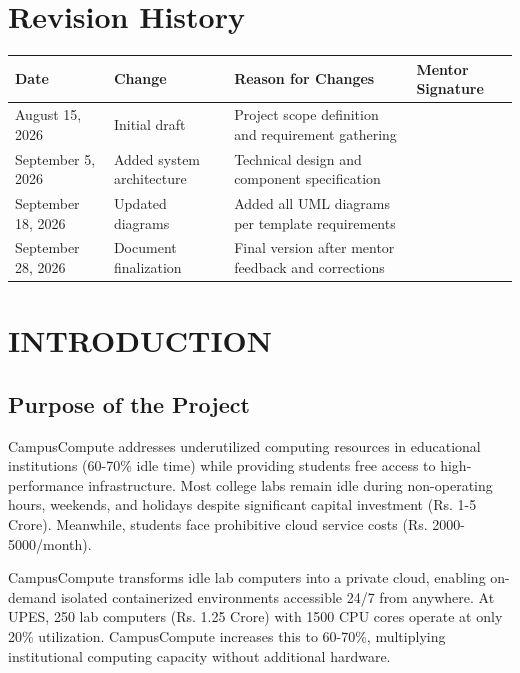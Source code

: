 \documentclass[12pt,a4paper]{article}
\begin{document}
\newpage

\tableofcontents
\newpage

\section*{Revision History}

\begin{table}[h]
\fontsize{10}{12}\selectfont
\begin{tabular}{|p{3cm}|p{4cm}|p{5cm}|p{3cm}|}
\hline
\textbf{Date} & \textbf{Change} & \textbf{Reason for Changes} & \textbf{Mentor Signature} \\
\hline
August 15, 2026 & Initial draft & Project scope definition and requirement gathering & \\
\hline
September 5, 2026 & Added system architecture & Technical design and component specification & \\
\hline
September 18, 2026 & Updated diagrams & Added all UML diagrams per template requirements & \\
\hline
September 28, 2026 & Document finalization & Final version after mentor feedback and corrections & \\
\hline
\end{tabular}
\end{table}

\newpage

\section{INTRODUCTION}

\subsection{Purpose of the Project}

CampusCompute addresses underutilized computing resources in educational institutions (60-70\% idle time) while providing students free access to high-performance infrastructure. Most college labs remain idle during non-operating hours, weekends, and holidays despite significant capital investment (Rs. 1-5 Crore). Meanwhile, students face prohibitive cloud service costs (Rs. 2000-5000/month).

CampusCompute transforms idle lab computers into a private cloud, enabling on-demand isolated containerized environments accessible 24/7 from anywhere. At UPES, 250 lab computers (Rs. 1.25 Crore) with 1500 CPU cores operate at only 20\% utilization. CampusCompute increases this to 60-70\%, multiplying institutional computing capacity without additional hardware.
\end{document}

